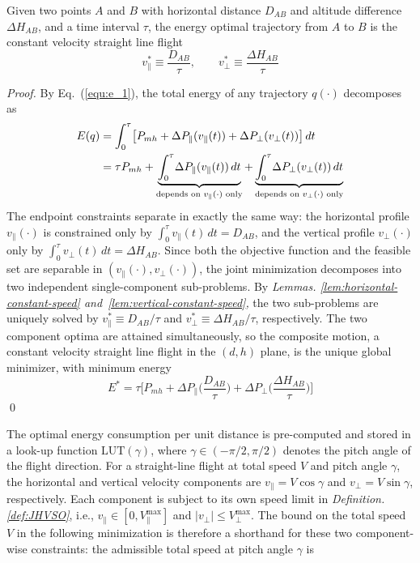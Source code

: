\begin{theorem}
\label{thm:constant-speed}
Given two points $A$ and $B$ with horizontal distance $D_{AB}$ and altitude difference $\Delta H_{AB}$, and a time interval $\tau$, the energy optimal trajectory from $A$ to $B$ is the constant velocity straight line flight
\[v_{\parallel}^{*} \equiv \frac{D_{AB}}{\tau}, \qquad v_{\perp}^{*} \equiv \frac{\Delta H_{AB}}{\tau}\]
\end{theorem}

\begin{proof}
    By Eq.~(\ref{equ:e_1}), the total energy of any trajectory $q(\cdot)$ decomposes as
    \begin{align}
    E(q)
    &= \int_{0}^{\tau}\!\big[P_{mh} + \Delta P_{\parallel}(v_{\parallel}(t)) + \Delta P_{\perp}(v_{\perp}(t))\big]\,dt \notag\\
    &= \tau P_{mh} + \underbrace{\int_{0}^{\tau}\!\Delta P_{\parallel}(v_{\parallel}(t))\,dt}%
    _{\text{depends on } v_{\parallel}(\cdot) \text{ only}} + \underbrace{\int_{0}^{\tau}\!\Delta P_{\perp}(v_{\perp}(t))\,dt}%
    _{\text{depends on } v_{\perp}(\cdot) \text{ only}}
    \label{eq:thm1-decomp}
    \end{align}
    The endpoint constraints separate in exactly the same way: the horizontal profile $v_{\parallel}(\cdot)$ is constrained only by $\int_{0}^{\tau} v_{\parallel}(t)\,dt = D_{AB}$, and the vertical profile $v_{\perp}(\cdot)$ only by $\int_{0}^{\tau} v_{\perp}(t)\,dt = \Delta H_{AB}$.
    Since both the objective function and the feasible set are separable in $(v_{\parallel}(\cdot), v_{\perp}(\cdot))$, the joint minimization decomposes into two independent single-component sub-problems.
    By \textit{Lemmas. \ref{lem:horizontal-constant-speed} and~\ref{lem:vertical-constant-speed},} the two sub-problems are uniquely solved by $v_{\parallel}^{*} \equiv D_{AB}/\tau$ and $v_{\perp}^{*} \equiv \Delta H_{AB}/\tau$, respectively.
    The two component optima are attained simultaneously, so the composite motion, a constant velocity straight line flight in the $(d,h)$ plane, is the unique global minimizer, with minimum energy
    \[
    E^{*} = \tau\Big[P_{mh} + \Delta P_{\parallel}\!\Big(\frac{D_{AB}}{\tau}\Big) + \Delta P_{\perp}\!\Big(\frac{\Delta H_{AB}}{\tau}\Big)\Big]
    \]\qed
\end{proof}

The optimal energy consumption per unit distance is pre-computed and stored in a look-up function $\mathrm{LUT}(\gamma)$, where $\gamma \in (-\pi/2, \pi/2)$ denotes the pitch angle of the flight direction.
For a straight-line flight at total speed $V$ and pitch angle $\gamma$, the horizontal and vertical velocity components are $v_{\parallel} = V\cos\gamma$ and $v_{\perp} = V\sin\gamma$, respectively.
Each component is subject to its own speed limit in \textit{Definition. \ref{def:JHVSO}}, i.e., $v_{\parallel} \in [0, V_{\parallel}^{\max}]$ and $|v_{\perp}| \le V_{\perp}^{\max}$.
The bound on the total speed $V$ in the following minimization is therefore a shorthand for these two component-wise constraints: the admissible total speed at pitch angle $\gamma$ is

